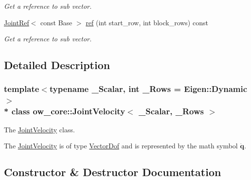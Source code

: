\begin{DoxyCompactItemize}
\begin{DoxyCompactList}\small\item\em Get a reference to sub vector. \end{DoxyCompactList}\item 
\hyperlink{classow__core_1_1JointRef}{Joint\+Ref}$<$ const Base $>$ \hyperlink{classow__core_1_1JointVelocity_a342f2b6401576aad55d1765186facc69}{ref} (int start\+\_\+row, int block\+\_\+rows) const \hypertarget{classow__core_1_1JointVelocity_a342f2b6401576aad55d1765186facc69}{}\label{classow__core_1_1JointVelocity_a342f2b6401576aad55d1765186facc69}

\begin{DoxyCompactList}\small\item\em Get a reference to sub vector. \end{DoxyCompactList}\end{DoxyCompactItemize}


\subsection{Detailed Description}
\subsubsection*{template$<$typename \+\_\+\+Scalar, int \+\_\+\+Rows = Eigen\+::\+Dynamic$>$\\*
class ow\+\_\+core\+::\+Joint\+Velocity$<$ \+\_\+\+Scalar, \+\_\+\+Rows $>$}

The \hyperlink{classow__core_1_1JointVelocity}{Joint\+Velocity} class. 

The \hyperlink{classow__core_1_1JointVelocity}{Joint\+Velocity} is of type \hyperlink{classow__core_1_1VectorDof}{Vector\+Dof} and is represented by the math symbol $\mathbf{\dot{q}}$. 

\subsection{Constructor \& Destructor Documentation}
